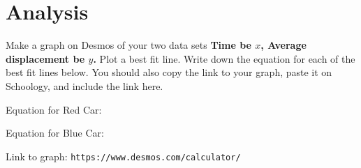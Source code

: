 \documentclass[10pt]{exam}
\begin{document}



\section*{Analysis}
Make a graph on Desmos of your two data sets \textbf{Time be $x$, Average displacement be $y$.}  Plot a best fit line.  Write down the equation for each of the best fit lines below.  You should also copy the link to your graph, paste it on Schoology, and include the link here.


    \vspace{1em}

    Equation for Red Car:

    \vspace{1em}

    Equation for Blue Car:

    \vspace{1em}

    Link to graph: \texttt{https://www.desmos.com/calculator/}\fillin[][15em]


    \vspace{2em}

\vs
\end{document}
